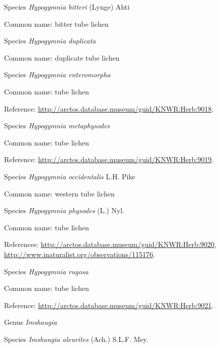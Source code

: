 \documentclass[9pt, article]{memoir}
\begin{document}
\begin{multicols}{2}
\vspace{6pt}\noindent\hspace{36pt}Species \textit{Hypogymnia bitteri} (Lynge) Ahti


Common name: bitter tube lichen

\vspace{6pt}\noindent\hspace{36pt}Species \textit{Hypogymnia duplicata}


Common name: duplicate tube lichen

\vspace{6pt}\noindent\hspace{36pt}Species \textit{Hypogymnia enteromorpha}


Common name: tube lichen

Reference: 
\url{http://arctos.database.museum/guid/KNWR:Herb:9018}.

\vspace{6pt}\noindent\hspace{36pt}Species \textit{Hypogymnia metaphysodes}


Common name: tube lichen

Reference: 
\url{http://arctos.database.museum/guid/KNWR:Herb:9019}.

\vspace{6pt}\noindent\hspace{36pt}Species \textit{Hypogymnia occidentalis} L.H. Pike


Common name: western tube lichen

\vspace{6pt}\noindent\hspace{36pt}Species \textit{Hypogymnia physodes} (L.) Nyl.


Common name: tube lichen

References: 
\url{http://arctos.database.museum/guid/KNWR:Herb:9020}, 
\url{http://www.inaturalist.org/observations/115176}.

\vspace{6pt}\noindent\hspace{36pt}Species \textit{Hypogymnia rugosa}


Common name: tube lichen

Reference: 
\url{http://arctos.database.museum/guid/KNWR:Herb:9021}.

\vspace{6pt}\noindent\hspace{30pt}Genus \textit{Imshaugia}


\vspace{6pt}\noindent\hspace{36pt}Species \textit{Imshaugia aleurites} (Ach.) S.L.F. Mey.



\end{multicols}
\end{document}
